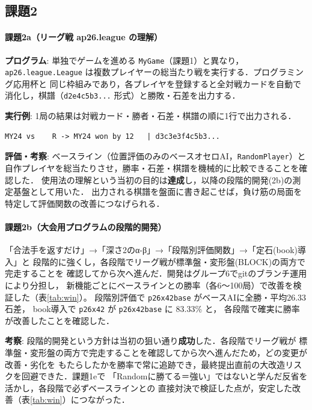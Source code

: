 \documentclass[11pt,a4j]{ujarticle} %
\begin{document}
\subsection{課題2}

\paragraph{課題2a（リーグ戦 ap26.league の理解）}
\textbf{プログラム}: 単独でゲームを進める {\verb+MyGame+}（課題1）と異なり，
{\verb+ap26.league.League+} は複数プレイヤーの総当たり戦を実行する．プログラミング応用杯と
同じ枠組みであり，各プレイヤを登録すると全対戦カードを自動で消化し，棋譜（{\verb+d2e4c5b3...+}
形式）と勝敗・石差を出力する．

\textbf{実行例}: 1局の結果は対戦カード・勝者・石差・棋譜の順に1行で出力される．
\begin{lstlisting}[caption=リーグ戦の出力例（1対戦カード）,label=ex:2a]
MY24 vs    R -> MY24 won by 12   | d3c3e3f4c5b3...
\end{lstlisting}

\textbf{評価・考察}: ベースライン（位置評価のみのベースオセロAI，{\verb+RandomPlayer+}）と
自作プレイヤを総当たりさせ，勝率・石差・棋譜を機械的に比較できることを確認した．
使用法の理解という当初の目的は\textbf{達成}し，以降の段階的開発(2b)の測定基盤として用いた．
出力される棋譜を盤面に書き起こせば，負け筋の局面を特定して評価関数の改善につなげられる．

\paragraph{課題2b（大会用プログラムの段階的開発）}
「合法手を返すだけ」→「深さ2のα-β」→「段階別評価関数」→「定石(book)導入」と
段階的に強くし，各段階でリーグ戦が標準盤・変形盤(BLOCK)の両方で完走することを
確認してから次へ進んだ．開発はグループ6でgitのブランチ運用により分担し，
新機能ごとにベースラインとの勝率（各6〜100局）で改善を検証した（表\ref{tab:win}）。
段階別評価で {\verb+p26x42base+} がベースAIに全勝・平均26.33石差，
book導入で {\verb+p26x42+} が {\verb+p26x42base+} に 83.33\% と，
各段階で確実に勝率が改善したことを確認した．

\textbf{考察}: 段階的開発という方針は当初の狙い通り\textbf{成功}した．各段階でリーグ戦が
標準盤・変形盤の両方で完走することを確認してから次へ進んだため，どの変更が改善・劣化を
もたらしたかを勝率で常に追跡でき，最終提出直前の大改造リスクを回避できた．課題1eで
「Randomに勝てる＝強い」ではないと学んだ反省を活かし，各段階で必ずベースラインとの
直接対決で検証した点が，安定した改善（表\ref{tab:win}）につながった．
\end{document}
